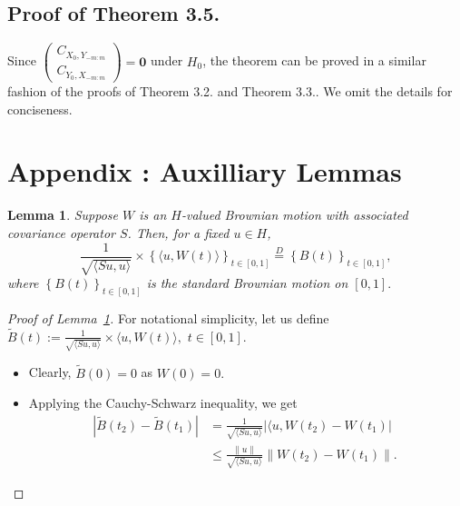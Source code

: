 \documentclass[11pt]{article}
\theoremstyle{plain}
\newtheorem{lemma}[theorem]{Lemma}
\theoremstyle{definition}
\theoremstyle{remark}
\begin{document}
\begin{appendix}
\subsection{Proof of Theorem 3.5.}
Since $\begin{pmatrix}
    C_{X_0,Y_{-m:m}}\\
    C_{Y_0,X_{-m:m}}
\end{pmatrix}=\mathbf{0}$ under $H_0$, the theorem can be proved in a similar fashion of the proofs of Theorem 3.2. and Theorem 3.3.. We omit the details for conciseness. 
\section*{Appendix \thesection: Auxilliary Lemmas}\label{sec:appne}
\begin{lemma}\label{lemma:distn_inner.prod_BM}
     Suppose $W$ is an $H$-valued Brownian motion with associated covariance operator $S$. Then, for a fixed $u \in H$, 
     $$\frac{1}{\sqrt{\langle Su, u \rangle}}\times\left\{\langle u, W(t)\rangle\right\}_{t \in [0,1]}\overset{D}{=} \left\{B(t)\right\}_{t \in [0,1]},$$
     where $\left\{B(t)\right\}_{t \in [0,1]}$ is the standard Brownian motion on $[0,1].$
 \end{lemma}
  \begin{proof}[Proof of Lemma~\ref{lemma:distn_inner.prod_BM}]
     For notational simplicity, let us define $\tilde{B}(t):=\frac{1}{\sqrt{\langle Su, u \rangle}}\times \langle u, W(t)\rangle,$ $t \in [0,1].$ 
     \begin{itemize}
         \item [(i)] Clearly, $\tilde{B}(0)=0$ as $W(0)=0.$
         \item[(ii)] Applying the Cauchy-Schwarz inequality, we get  
         \begin{align*}
             \left|\tilde{B}(t_2)-\tilde{B}(t_1)\right|&=\frac{1}{\sqrt{\langle Su, u \rangle}} \left|\langle u, W(t_2)-W(t_1)\right|\\
             &\leq \frac{\left\|u\right\|}{\sqrt{\langle Su, u \rangle}} \left\| W(t_2)-W(t_1)\right\|.\;
         \end{align*}
         

\end{itemize}
\end{proof}
\end{appendix}
\end{document}
